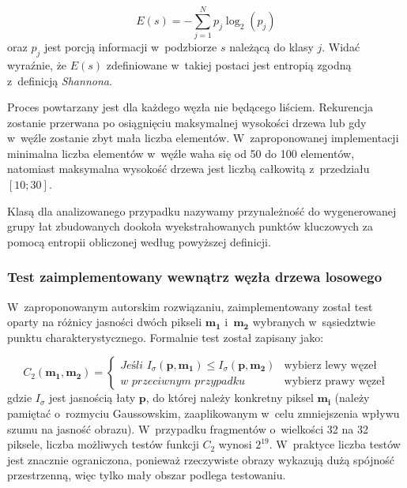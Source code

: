           \begin{equation}
              E(s) = - \sum\limits_{j=1}^{N} p_{j} \log_{2}(p_{j})
          \end{equation}
        oraz $p_{j}$ jest porcją informacji w~podzbiorze $s$ należącą do klasy $j$. Widać wyraźnie, że $E(s)$ zdefiniowane w~takiej postaci jest entropią zgodną z~definicją \textit{Shannona}.

        Proces powtarzany jest dla każdego węzła nie będącego liściem. Rekurencja zostanie przerwana po osiągnięciu maksymalnej wysokości drzewa lub gdy w~węźle zostanie zbyt mała liczba elementów. W~zaproponowanej implementacji minimalna liczba elementów w~węźle waha się od 50 do 100 elementów, natomiast maksymalna wysokość drzewa jest liczbą całkowitą z~przedziału $[10; 30]$.

        Klasą dla analizowanego przypadku nazywamy przynależność do wygenerowanej grupy łat zbudowanych dookoła wyekstrahowanych punktów kluczowych za pomocą entropii obliczonej według powyższej definicji.

      \subsubsection{Test zaimplementowany wewnątrz węzła drzewa losowego}

        W~zaproponowanym autorskim rozwiązaniu, zaimplementowany został test oparty na różnicy jasności dwóch pikseli $\mathbf{m_{1}}$ i~$\mathbf{m_{2}}$ wybranych w~sąsiedztwie punktu charakterystycznego. Formalnie test został zapisany jako:

          \begin{equation}
            C_{2}(\mathbf{m_{1}}, \mathbf{m_{2}}) = \begin{cases}
              \textit{Jeśli } I_{\sigma}(\mathbf{p}, \mathbf{m_{1}}) \leq I_{\sigma}(\mathbf{p}, \mathbf{m_{2}}) & \text{wybierz lewy węzeł} \\
              \textit{w~przeciwnym przypadku} & \text{wybierz prawy węzeł}
            \end{cases}
          \end{equation}
        gdzie $I_{\sigma}$ jest jasnością łaty $\mathbf{p}$, do której należy konkretny piksel $\mathbf{m_{i}}$ (należy pamiętać o~rozmyciu Gaussowskim, zaaplikowanym w~celu zmniejszenia wpływu szumu na jasność obrazu). W~przypadku fragmentów o~wielkości 32 na 32 piksele, liczba możliwych testów funkcji $C_{2}$ wynosi $2^{19}$. W~praktyce liczba testów jest znacznie ograniczona, ponieważ rzeczywiste obrazy wykazują dużą spójność przestrzenną, więc tylko mały obszar podlega testowaniu.

